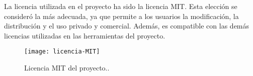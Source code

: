 \newpage
La licencia utilizada en el proyecto ha sido la licencia MIT. Esta elección se consideró la más adecuada, ya que permite a los usuarios la modificación, la distribución y el uso privado y comercial. Además, es compatible con las demás licencias utilizadas en las herramientas del proyecto.

\begin{figure}[htb]
\centering
\texttt{[image: licencia-MIT]}
\caption{Licencia MIT del proyecto..}
\label{fig:licencia-MIT}
\end{figure}